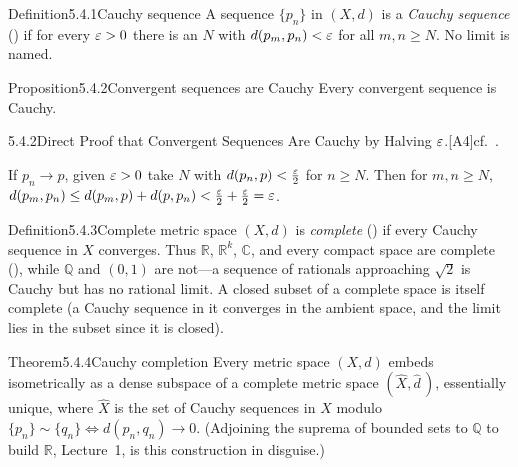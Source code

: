 \documentclass[main.tex]{subfiles}
\begin{document}

\begin{Obj}{Definition}{5.4.1}{Cauchy sequence}
A sequence $\{p_n\}$ in $(X,d)$ is a \emph{Cauchy sequence} () if for every $\varepsilon>0$ there is
an $N$ with $d(p_m,p_n)<\varepsilon$ for all $m,n\ge N$. No limit is named.
\end{Obj}

\begin{Obj}{Proposition}{5.4.2}{Convergent sequences are Cauchy}
Every convergent sequence is Cauchy.
\end{Obj}
\begin{Prf}{5.4.2}{Direct Proof that Convergent Sequences Are Cauchy by Halving $\varepsilon$.}{[A4]\quad cf.\ .}
\item If $p_n\to p$, given $\varepsilon>0$ take $N$ with $d(p_n,p)<\tfrac{\varepsilon}2$ for $n\ge N$. Then for
  $m,n\ge N$, $d(p_m,p_n)\le d(p_m,p)+d(p,p_n)<\tfrac{\varepsilon}2+\tfrac{\varepsilon}2=\varepsilon$.
\end{Prf}

\begin{Obj}{Definition}{5.4.3}{Complete metric space}
$(X,d)$ is \emph{complete} () if every Cauchy sequence in $X$ converges. Thus $\mathbb R$,
$\mathbb R^k$, $\mathbb C$, and every compact space are complete (), while $\mathbb Q$ and
$(0,1)$ are not---a sequence of rationals approaching $\sqrt2$ is Cauchy but has no rational limit. A closed subset of a complete space is itself complete (a Cauchy sequence in it converges in the
ambient space, and the limit lies in the subset since it is closed).
\end{Obj}

\begin{Obj}{Theorem}{5.4.4}{Cauchy completion}
Every metric space $(X,d)$ embeds isometrically as a dense subspace of a complete metric space
$(\widehat X,\widehat d\,)$, essentially unique, where $\widehat X$ is the set of Cauchy sequences in
$X$ modulo $\{p_n\}\sim\{q_n\}\iff d(p_n,q_n)\to0$. (Adjoining the suprema of bounded sets to
$\mathbb Q$ to build $\mathbb R$, Lecture~1, is this construction in disguise.)
\end{Obj}

\end{document}
